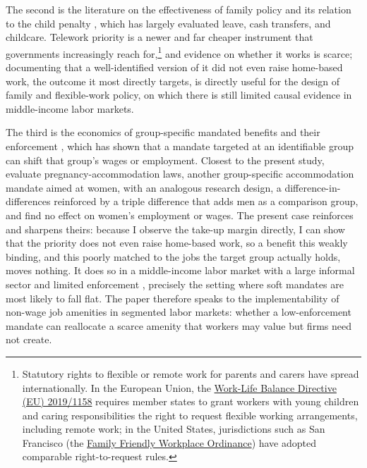 \documentclass[12pt]{article}
\begin{document}
The second is the literature on the effectiveness of family policy and its relation to the child penalty \citep{kleven2019denmark,kleven2019countries,klevenatlas2025,addadustmann2017,olivettipetrongolo2017,angelov2016,lundborg2017}, which has largely evaluated leave, cash transfers, and childcare. Telework priority is a newer and far cheaper instrument that governments increasingly reach for,\footnote{Statutory rights to flexible or remote work for parents and carers have spread internationally. In the European Union, the \href{https://eur-lex.europa.eu/eli/dir/2019/1158/oj}{Work-Life Balance Directive (EU) 2019/1158} requires member states to grant workers with young children and caring responsibilities the right to request flexible working arrangements, including remote work; in the United States, jurisdictions such as San Francisco (the \href{https://www.sf.gov/information--family-friendly-workplace-ordinance}{Family Friendly Workplace Ordinance}) have adopted comparable right-to-request rules.} and evidence on whether it works is scarce; documenting that a well-identified version of it did not even raise home-based work, the outcome it most directly targets, is directly useful for the design of family and flexible-work policy, on which there is still limited causal evidence in middle-income labor markets.

The third is the economics of group-specific mandated benefits and their enforcement \citep{summers1989,gruber1994}, which has shown that a mandate targeted at an identifiable group can shift that group's wages or employment. Closest to the present study, \citet{battagliabrown2025} evaluate pregnancy-accommodation laws, another group-specific accommodation mandate aimed at women, with an analogous research design, a difference-in-differences reinforced by a triple difference that adds men as a comparison group, and find no effect on women's employment or wages. The present case reinforces and sharpens theirs: because I observe the take-up margin directly, I can show that the priority does not even raise home-based work, so a benefit this weakly binding, and this poorly matched to the jobs the target group actually holds, moves nothing. It does so in a middle-income labor market with a large informal sector and limited enforcement \citep{ulyssea2018,gerardgonzaga2021,almeidacarneiro2012}, precisely the setting where soft mandates are most likely to fall flat. The paper therefore speaks to the implementability of non-wage job amenities in segmented labor markets: whether a low-enforcement mandate can reallocate a scarce amenity that workers may value but firms need not create.
\end{document}
